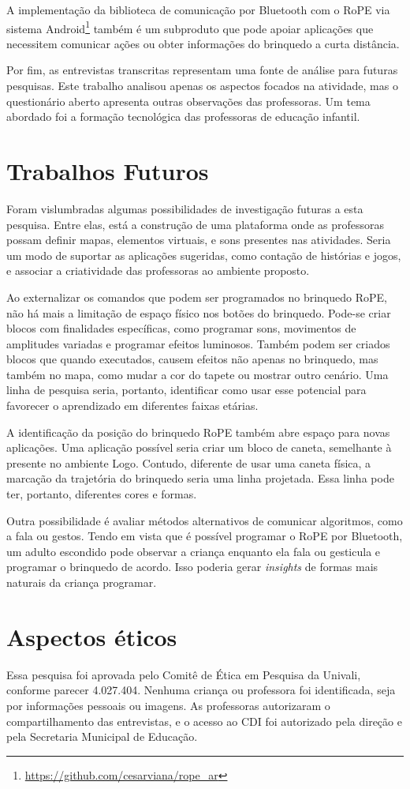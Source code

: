 A implementação da biblioteca de comunicação por Bluetooth com o RoPE via sistema Android\footnote{\url{https://github.com/cesarviana/rope_ar}} também é um subproduto que pode apoiar aplicações que necessitem comunicar ações ou obter informações do brinquedo a curta distância. 

Por fim, as entrevistas transcritas representam uma fonte de análise para futuras pesquisas. Este trabalho analisou apenas os aspectos focados na atividade, mas o questionário aberto apresenta outras observações das professoras. Um tema abordado foi a formação tecnológica das professoras de educação infantil.

\section{Trabalhos Futuros}
\label{c_conclusao-trabalhos-futuros}
Foram vislumbradas algumas possibilidades de investigação futuras a esta pesquisa. Entre elas, está a construção de uma plataforma onde as professoras possam definir mapas, elementos virtuais, e sons presentes nas atividades. Seria um modo de suportar as aplicações sugeridas, como contação de histórias e jogos, e associar a criatividade das professoras ao ambiente proposto.

Ao externalizar os comandos que podem ser programados no brinquedo RoPE, não há mais a limitação de espaço físico nos botões do brinquedo. Pode-se criar blocos com finalidades específicas, como programar sons, movimentos de amplitudes variadas e programar efeitos luminosos. Também podem ser criados blocos que quando executados, causem efeitos não apenas no brinquedo, mas também no mapa, como mudar a cor do tapete ou mostrar outro cenário. Uma linha de pesquisa seria, portanto, identificar como usar esse potencial para favorecer o aprendizado em diferentes faixas etárias.

A identificação da posição do brinquedo RoPE também abre espaço para novas aplicações. Uma aplicação possível seria criar um bloco de caneta, semelhante à presente no ambiente Logo. Contudo, diferente de usar uma caneta física, a marcação da trajetória do brinquedo seria uma linha projetada. Essa linha pode ter, portanto, diferentes cores e formas.

Outra possibilidade é avaliar métodos alternativos de comunicar algoritmos, como a fala ou gestos. Tendo em vista que é possível programar o RoPE por Bluetooth, um adulto escondido pode observar a criança enquanto ela fala ou gesticula e programar o brinquedo de acordo. Isso poderia gerar \textit{insights} de formas mais naturais da criança programar.

\section{Aspectos éticos}
Essa pesquisa foi aprovada pelo Comitê de Ética em Pesquisa da Univali, conforme parecer 4.027.404. Nenhuma criança ou professora foi identificada, seja por informações pessoais ou imagens. As professoras autorizaram o compartilhamento das entrevistas, e o acesso ao CDI foi autorizado pela direção e pela Secretaria Municipal de Educação.
